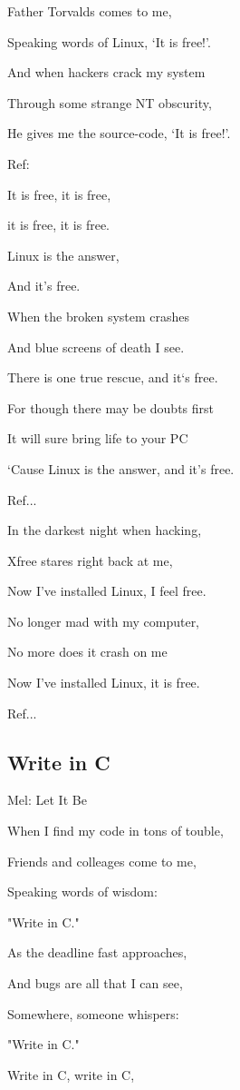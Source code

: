 Father Torvalds comes to me,

Speaking words of Linux, ‘It is free!’.

And when hackers crack my system

Through some strange NT obscurity,

He gives me the source-code, ‘It is free!’.\bigskip

Ref:

It is free, it is free,

it is free, it is free.

Linux is the answer,

And it’s free.\bigskip

When the broken system crashes

And blue screens of death I see.

There is one true rescue, and it‘s free.

For though there may be doubts first

It will sure bring life to your PC

‘Cause Linux is the answer, and it’s free.\bigskip

Ref...\bigskip

In the darkest night when hacking,

Xfree stares right back at me,

Now I’ve installed Linux, I feel free.

No longer mad with my computer,

No more does it crash on me

Now I’ve installed Linux, it is free.\bigskip

Ref...

\subsection{\textbf{Write in C}}

Mel: Let It Be 


When I find my code in tons of touble,

Friends and colleages come to me,

Speaking words of wisdom:

"Write in C."\bigskip

As the deadline fast approaches,

And bugs are all that I can see,

Somewhere, someone whispers:

"Write in C."\bigskip

Write in C, write in C,

